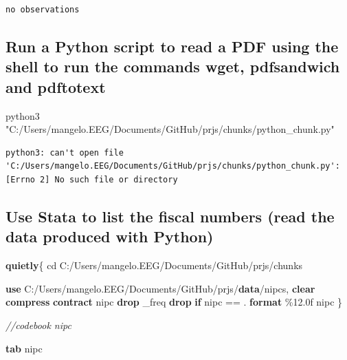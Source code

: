 \documentclass[
  12pt,
]{article}
\newenvironment{Shaded}{\begin{snugshade}}{\end{snugshade}}
\newcommand{\CommentTok}[1]{\textcolor[rgb]{0.56,0.35,0.01}{\textit{#1}}}
\newcommand{\ExtensionTok}[1]{#1}
\newcommand{\KeywordTok}[1]{\textcolor[rgb]{0.13,0.29,0.53}{\textbf{#1}}}
\newcommand{\NormalTok}[1]{#1}
\newcommand{\StringTok}[1]{\textcolor[rgb]{0.31,0.60,0.02}{#1}}
\begin{document}
\begin{verbatim}
no observations
\end{verbatim}

\hypertarget{run-a-python-script-to-read-a-pdf-using-the-shell-to-run-the-commands-wget-pdfsandwich-and-pdftotext}{%
\subsection{Run a Python script to read a PDF using the shell to run the commands wget, pdfsandwich and pdftotext}\label{run-a-python-script-to-read-a-pdf-using-the-shell-to-run-the-commands-wget-pdfsandwich-and-pdftotext}}

\begin{Shaded}
\begin{Highlighting}[]
\ExtensionTok{python3} \StringTok{"C:/Users/mangelo.EEG/Documents/GitHub/prjs/chunks/python\_chunk.py"}
\end{Highlighting}
\end{Shaded}

\begin{verbatim}
python3: can't open file 'C:/Users/mangelo.EEG/Documents/GitHub/prjs/chunks/python_chunk.py': [Errno 2] No such file or directory
\end{verbatim}

\hypertarget{use-stata-to-list-the-fiscal-numbers-read-the-data-produced-with-python}{%
\subsection{Use Stata to list the fiscal numbers (read the data produced with Python)}\label{use-stata-to-list-the-fiscal-numbers-read-the-data-produced-with-python}}

\begin{Shaded}
\begin{Highlighting}[]

\KeywordTok{quietly}\NormalTok{\{}
\NormalTok{cd C:/Users/mangelo.EEG/Documents/GitHub/prjs/chunks}

\KeywordTok{use}\NormalTok{ C:/Users/mangelo.EEG/Documents/GitHub/prjs/}\KeywordTok{data}\NormalTok{/nipcs, }\KeywordTok{clear}
\KeywordTok{compress}
\KeywordTok{contract}\NormalTok{ nipc}
\KeywordTok{drop}\NormalTok{ \_freq}
\KeywordTok{drop} \KeywordTok{if}\NormalTok{ nipc == .}
\KeywordTok{format}\NormalTok{ \%12.0f nipc}
\NormalTok{\}}

\CommentTok{//codebook nipc}

\KeywordTok{tab}\NormalTok{ nipc}
\end{Highlighting}
\end{Shaded}
\end{document}
